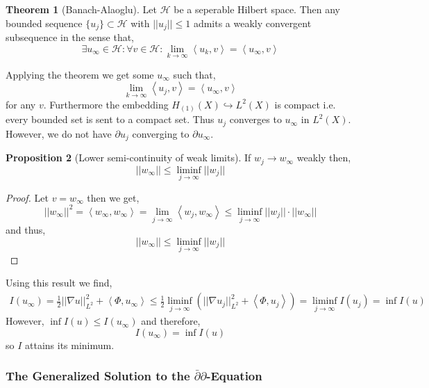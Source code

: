 \documentclass[12pt]{extarticle}
\theoremstyle{definition}
\newtheorem{theorem}{Theorem}[section]
\newtheorem{proposition}[theorem]{Proposition}
\begin{document}
\begin{theorem}[Banach-Alaoglu]
Let $\mathcal{H}$ be a seperable Hilbert space. Then any bounded sequence $\{ u_j \} \subset \mathcal{H}$ with $||u_j|| \le 1$ admits a weakly convergent subsequence in the sense that,
\[ \exists u_{\infty} \in \mathcal{H} : \forall v \in \mathcal{H} :  \lim_{k \to \infty} \left< u_{k}, v \right> = \left< u_{\infty}, v \right> \]
\end{theorem}
Applying the theorem we get some $u_{\infty}$ such that,
\[ \lim_{k \to \infty} \left< u_j, v \right> = \left< u_{\infty}, v \right> \]
for any $v$. Furthermore the embedding $H_{(1)}(X) \hookrightarrow L^2(X)$ is compact i.e. every bounded set is sent to a compact set. Thus $u_j$ converges to $u_{\infty}$ in $L^2(X)$. However, we do not have $\partial u_j$ converging to $\partial u_{\infty}$. 

\begin{proposition}[Lower semi-continuity of weak limits]
If $w_j \to w_{\infty}$ weakly then,
\[ ||w_{\infty} || \le \liminf_{j \to \infty} ||w_j|| \]
\end{proposition}

\begin{proof}
Let $v = w_{\infty}$ then we get,
\[ ||w_{\infty}||^2 = \left< w_{\infty}, w_{\infty} \right> = \lim_{j \to \infty} \left< w_{j}, w_{\infty} \right> \le \liminf_{j \to \infty} || w_j|| \cdot ||w_{\infty} || \]
and thus,
\[ ||w_{\infty}|| \le \liminf_{j \to \infty} || w_j || \]
\end{proof}
Using this result we find,
\begin{align*}
I(u_{\infty}) = \tfrac{1}{2} ||\nabla u||_{L^2}^2 + \left< \Phi, u_{\infty} \right> \le \tfrac{1}{2} \liminf_{j \to \infty} \left( || \nabla u_j ||_{L^2}^2 + \left< \Phi, u_j \right> \right) = \liminf_{j \to \infty} I(u_j) = \inf I(u) 
\end{align*}
However, $\inf I(u) \le I(u_{\infty})$ and therefore,
\[ I(u_{\infty}) = \inf I(u) \]
so $I$ attains its minimum. 

\subsubsection{The Generalized Solution to the $\bar{\partial} \partial$-Equation}
\end{document}
